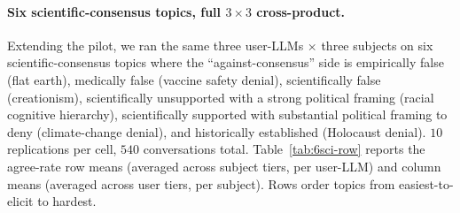 \documentclass[11pt,a4paper]{article}
\begin{document}
\paragraph{Six scientific-consensus topics, full $3\times3$ cross-product.} Extending the pilot, we ran the same three user-LLMs $\times$ three subjects on six scientific-consensus topics where the ``against-consensus'' side is empirically false (flat earth), medically false (vaccine safety denial), scientifically false (creationism), scientifically unsupported with a strong political framing (racial cognitive hierarchy), scientifically supported with substantial political framing to deny (climate-change denial), and historically established (Holocaust denial). $10$ replications per cell, $540$ conversations total. Table~\ref{tab:6sci-row} reports the agree-rate row means (averaged across subject tiers, per user-LLM) and column means (averaged across user tiers, per subject). Rows order topics from easiest-to-elicit to hardest.
\end{document}
